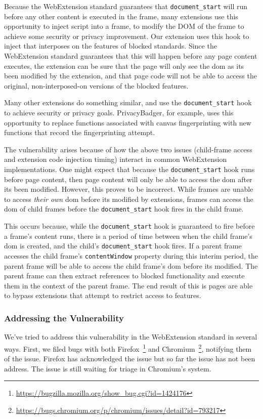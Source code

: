 Because the WebExtension standard guarantees that \texttt{document\_start} will
run before any other content is executed in the frame, many extensions use
this opportunity to inject script into a frame, to modify the DOM of the frame
to achieve some security or privacy improvement.  Our extension uses this
hook to inject \JS that interposes on the features of blocked standards.
Since the WebExtension standard guarantees that this will happen
before any page content executes, the extension can be sure that the page will
only see the \gls{dom} as its been modified by the extension, and that page code
will not be able to access the original, non-interposed-on versions of the
blocked features.

Many other extensions do something similar, and use the
\texttt{document\_start} hook to achieve security or privacy goals.
PrivacyBadger, for example, uses this opportunity to replace \WAPI functions
associated with canvas fingerprinting with new functions that record the
fingerprinting attempt.


The vulnerability arises because of how the above two issues (child-frame
access and extension code injection timing) interact in common WebExtension
implementations.  One might expect that because the \texttt{document\_start}
hook runs before page content, then page content will only be able to access
the \gls{dom} after its been modified.  However, this proves to be incorrect.
While frames are unable to access \emph{their own} \gls{dom} before its
modified by extensions, frames can access the \gls{dom} of child frames before
the \texttt{document\_start} hook fires in the child frame.

This occurs because, while the \texttt{document\_start} hook is guaranteed to
fire before a frame's content runs, there is a period of time between when the
child frame's \gls{dom} is created, and the child's \texttt{document\_start}
hook fires.  If a parent frame accesses the child frame's
\texttt{contentWindow} property during this interim period, the parent frame
will be able to access the child frame's \gls{dom} before its modified.  The
parent frame can then extract references to blocked functionality and execute
them in the context of the parent frame.  The end result of this is pages are
able to bypass extensions that attempt to restrict access to \WAPI features.


\subsubsection{Addressing the Vulnerability}
We've tried to address this vulnerability in the WebExtension standard in
several ways.  First, we filed bugs with both
Firefox~\footnote{\url{https://bugzilla.mozilla.org/show_bug.cgi?id=1424176}}
and Chromium~\footnote{\url{https://bugs.chromium.org/p/chromium/issues/detail?id=793217}},
notifying them of the issue.  Firefox has acknowledged the issue but so far the
issue has not been address.  The issue is still waiting for triage in
Chromium's system.

